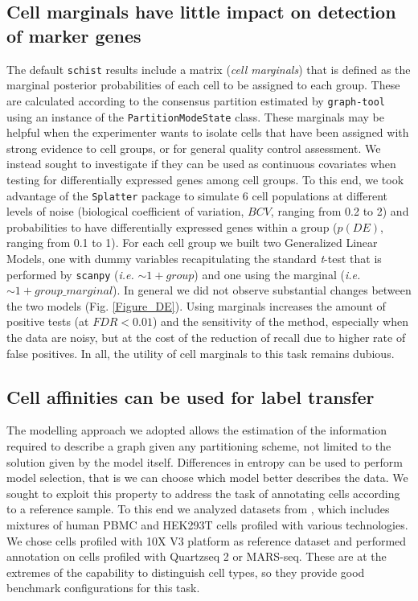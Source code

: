 \documentclass[10pt]{article}
\begin{document}
\subsection*{Cell marginals have little impact on detection of marker genes}

The default \texttt{schist} results include a matrix (\emph{cell marginals}) that is defined as the marginal posterior probabilities of each cell to be assigned to each group. These are calculated according to the consensus partition estimated by \texttt{graph-tool} using an instance of the \texttt{PartitionModeState} class. These marginals may be helpful when the experimenter wants to isolate cells that have been assigned with strong evidence to cell groups, or for general quality control assessment. We instead sought to investigate if they can be used as continuous covariates when testing for differentially expressed genes among cell groups. To this end, we took advantage of the \texttt{Splatter} package \cite{Zappia_Oshlack_2017} to simulate 6 cell populations at different levels of noise (biological coefficient of variation, $BCV$, ranging from 0.2 to 2) and probabilities to have differentially expressed genes within a group ($p(DE)$, ranging from 0.1 to 1). For each cell group we built two Generalized Linear Models, one with dummy variables recapitulating the standard \emph{t}-test that is performed by \texttt{scanpy} (\emph{i.e.} $\sim1 + group$) and one using the marginal (\emph{i.e.} $\sim1 + group\_marginal$). In general we did not observe substantial changes between the two models (Fig. \ref{Figure_DE}). Using marginals increases the amount of positive tests (at $FDR<0.01$) and the sensitivity of the method, especially when the data are noisy, but at the cost of the reduction of recall due to higher rate of false positives. In all, the utility of cell marginals to this task remains dubious.

\subsection*{Cell affinities can be used for label transfer}

The modelling approach we adopted allows the estimation of the information required to describe a graph given any partitioning scheme, not limited to the solution given by the model itself. Differences in entropy can be used to perform model selection, that is we can choose which model better describes the data. We sought to exploit this property to address the task of annotating cells according to a reference sample. To this end we analyzed datasets from \cite{mereu_2020}, which includes mixtures of human PBMC and HEK293T cells profiled with various technologies. We chose cells profiled with 10X V3 platform as reference dataset and performed annotation on cells profiled with Quartzseq 2 or MARS-seq. These are at the extremes of the capability to distinguish cell types, so they provide good benchmark configurations for this task. 
\end{document}
